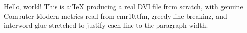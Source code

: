 
\def\greet#1{Hello, #1!}
\greet{world}
This is aiTeX producing a real DVI file from scratch, with genuine Computer
Modern metrics read from cmr10.tfm, greedy line breaking, and interword glue
stretched to justify each line to the paragraph width.
\bye
